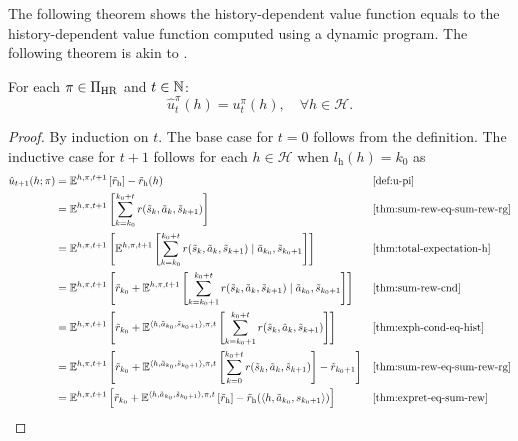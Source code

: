 The following theorem shows the history-dependent value function equals to the history-dependent value function computed using a dynamic program. The following theorem is akin to \citep[theorem~4.2.1]{Puterman2005}.
\begin{theorem} \label{thm:dph-correct-vf}
For each $\pi\in \Pi_{\mathrm{HR}}$ and $t\in \mathbb{N}$:
  \[
    \hat{u}^{\pi}_t(h)
    =
    u^{\pi}_t(h), \quad \forall h\in \mathcal{H}.
  \]
\end{theorem}
\begin{proof}
By induction on $t$. The base case for $t=0$ follows from the definition. The inductive case for $t + 1$ follows for each $h\in \mathcal{H}$ when $l_{\mathrm{h}}(h) = k_0$ as
{\allowdisplaybreaks
\begin{align*}
\hat{u}_{t+1}(h; \pi)
&= \E^{h, \pi, t+1} \left[ \tilde{r}_{\mathrm{h}} \right] -\tilde{r}_{\mathrm{h}}(h) && \text{\cref{def:u-pi}}\\
&= \E^{h, \pi, t+1} \left[ \sum_{k=k_0}^{k_0+t}  r(\tilde{s}_k, \tilde{a}_k, \tilde{s}_{k+1})  \right]  && \text{\cref{thm:sum-rew-eq-sum-rew-rg}} \\
&= \E^{h, \pi, t+1} \left[  \E^{h, \pi, t+1} \left[ \sum_{k=k_0}^{k_0+t} r(\tilde{s}_k, \tilde{a}_k, \tilde{s}_{k+1}) \mid \tilde{a}_{k_0}, \tilde{s}_{k_0+1} \right] \right]  && \text{\cref{thm:total-expectation-h}} \\
&= \E^{h, \pi, t+1} \left[\tilde{r}_{k_0} +  \E^{h, \pi, t+1} \left[ \sum_{k=k_0+1}^{k_0+t}  r(\tilde{s}_k, \tilde{a}_k, \tilde{s}_{k+1}) \mid \tilde{a}_{k_0}, \tilde{s}_{k_0+1} \right] \right] && \text{\cref{thm:sum-rew-cnd}} \\
&= \E^{h, \pi, t+1} \left[\tilde{r}_{k_0} +  \E^{\langle h,\tilde{a}_{k_0},\tilde{s}_{k_0+1}\rangle, \pi, t} \left[ \sum_{k=k_0+1}^{k_0+t} r(\tilde{s}_k, \tilde{a}_k, \tilde{s}_{k+1})  \right] \right] && \text{\cref{thm:exph-cond-eq-hist}} \\
&= \E^{h, \pi, t+1} \left[\tilde{r}_{k_0}  +  \E^{\langle h,\tilde{a}_{k_0},\tilde{s}_{k_0+1}\rangle, \pi, t} \left[ \sum_{k=0}^{k_0+t} r(\tilde{s}_k, \tilde{a}_k, \tilde{s}_{k+1})  \right] - \tilde{r}_{k_0+1} \right] &&  \text{\cref{thm:sum-rew-eq-sum-rew-rg}}\\
&= \E^{h, \pi, t+1} \left[\tilde{r}_{k_0}+  \E^{\langle h,\tilde{a}_{k_0},\tilde{s}_{k_0+1}\rangle, \pi, t} \left[ \tilde{r}_{\mathrm{h}} \right] - \tilde{r}_{\mathrm{h}}(\langle h, \tilde{a}_{k_0}, s_{k_0+1}\rangle) \right] &&  \text{\cref{thm:expret-eq-sum-rew}}\\

\end{align*}}
\end{proof}
